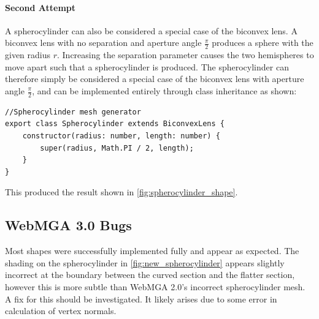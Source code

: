 \paragraph{Second Attempt}

A spherocylinder can also be considered a special case of the biconvex lens. A biconvex lens with no separation and aperture angle $\frac{\pi}{2}$ produces a sphere with the given radius $r$. Increasing the separation parameter causes the two hemispheres to move apart such that a spherocylinder is produced. The spherocylinder can therefore simply be considered a special case of the biconvex lens with aperture angle $\frac{\pi}{2}$, and can be implemented entirely through class inheritance as shown:
\begin{lstlisting}
//Spherocylinder mesh generator
export class Spherocylinder extends BiconvexLens {
    constructor(radius: number, length: number) {
        super(radius, Math.PI / 2, length);
    }
}
\end{lstlisting}
This produced the result shown in \cref{fig:spherocylinder_shape}.

\subsection{WebMGA 3.0 Bugs}
\label{shape_bug_spher}
Most shapes were successfully implemented fully and appear as expected. The shading on the spherocylinder in \cref{fig:new_spherocylinder} appears slightly incorrect at the boundary between the curved section and the flatter section, however this is more subtle than WebMGA 2.0's incorrect spherocylinder mesh. A fix for this should be investigated. It likely arises due to some error in calculation of vertex normals.
